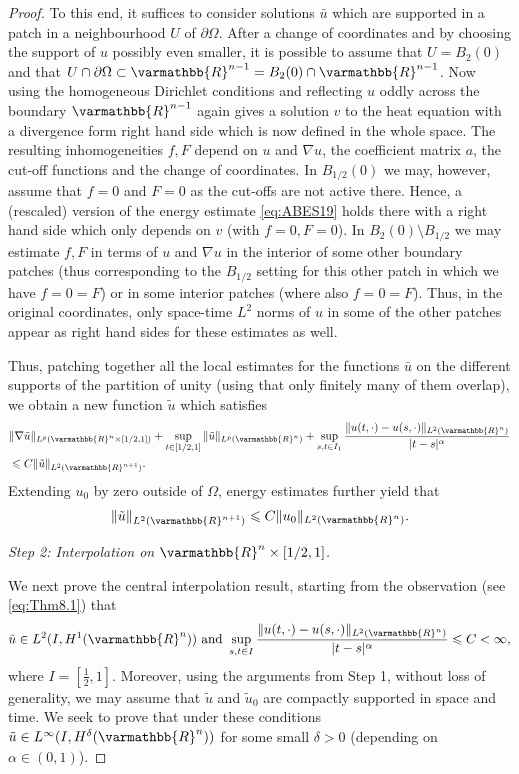 \documentclass[12pt,twoside]{amsart}
\numberwithin{equation}{section}
\renewcommand{\leq}{\leqslant}
\renewcommand{\mathbb}{\varmathbb}
\newcommand {\R} {\mathbb{R}} \newcommand {\Z} {\mathbb{Z}}
\begin{document}
\begin{proof}
To this end, it suffices to consider solutions $\bar{u}$ which are supported in a patch in a neighbourhood $U$ of $\partial \Omega$. After a change of coordinates and by choosing the support of $u$ possibly even smaller, it is possible to assume that $U=B_2(0)$ and that $U\cap \partial \Omega \subset \R^{n-1} = B_2(0)\cap \R^{n-1}$. Now using the homogeneous Dirichlet conditions and reflecting $u$ oddly across the boundary $\R^{n-1}$ again gives a solution $v$ to the heat equation with a divergence form right hand side which is now defined in the whole space. 
The resulting inhomogeneities $f,F$ depend on $u$ and $\nabla u$, the coefficient matrix $a$, the cut-off functions and the change of coordinates. In $B_{1/2}(0)$ we may, however, assume that $f=0$ and $F=0$ as the cut-offs are not active there. Hence, a (rescaled) version of the energy estimate \eqref{eq:ABES19} holds there with a right hand side which only depends on $v$ (with $f=0,F=0$).
In $B_2(0)\setminus B_{1/2}$ we may estimate $f,F$ in terms of $u$ and $\nabla u$ in the interior of some other boundary patches (thus corresponding to the $B_{1/2}$ setting for this other patch in which we have $f=0=F$) or in some interior patches (where also $f=0=F$). Thus, in the original coordinates, only space-time $L^2$ norms of $u$ in some of the other patches appear as right hand sides for these estimates as well.

Thus, patching together all the local estimates for the functions $\bar{u}$ on the different supports of the partition of unity (using that only finitely many of them overlap), we obtain a new function $\tilde{u}$ which satisfies
\begin{align}
\label{eq:Thm8.1}
\begin{split}
&\|\nabla \tilde{u}\|_{L^p(\R^n \times [1/2,1])} + \sup\limits_{t\in [1/2,1]}\|\tilde{u}\|_{L^p(\R^{n})} + \sup\limits_{s,t\in I_1}\frac{\|u(t,\cdot)-u(s,\cdot)\|_{L^2(\R^n)}}{|t-s|^{\alpha}}  \\
&\leq C  \|\tilde{u}\|_{L^2(\R^{n+1})}.
\end{split}
\end{align}
Extending $u_0$ by zero outside of $\Omega$, energy estimates further yield that 
\begin{align*}
\|\tilde{u}\|_{L^2(\R^{n+1})} \leq C \|u_0\|_{L^2(\R^n)}.
\end{align*}


\emph{Step 2: Interpolation on $\R^n \times [1/2,1]$.}

We next prove the central interpolation result, starting from the observation (see \eqref{eq:Thm8.1}) that
\begin{align*}
\tilde{u} \in L^2(I,H^1(\R^n)) \mbox{ and } \sup\limits_{s,t\in I}\frac{\|u(t,\cdot)-u(s,\cdot)\|_{L^2(\R^n)}}{|t-s|^{\alpha}} \leq C<\infty,
\end{align*}
where $I = [\frac{1}{2},1]$. Moreover, using the arguments from Step 1, without loss of generality, we may assume that $\tilde{u}$ and $\tilde{u}_0$ are compactly supported in space and time.
We seek to prove that under these conditions $\tilde{u}\in L^{\infty}(I,H^{\delta}(\R^n))$ for some small $\delta>0$ (depending on $\alpha \in (0,1)$). 


\end{proof}
\end{document}
